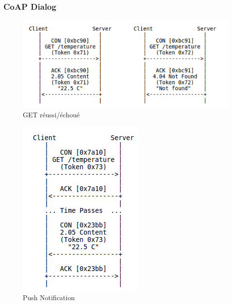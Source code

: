 \documentclass[compress]{beamer}
\begin{document}
\begin{frame}
	\frametitle{CoAP Dialog}
		\center
	\begin{minipage}[b]{.6\textwidth}
	\begin{figure}[h]
	\includegraphics[width=\textwidth]{coap_normal.png}
	\caption{GET réussi/échoué \cite{rfc7252}}
	\end{figure}
	\end{minipage}
	\begin{minipage}[b]{.3\textwidth}
	\begin{figure}[h]
	\includegraphics[width=\textwidth]{coap_push.png}
	\caption{Push Notification \cite{rfc7252}}
	\end{figure}
	\end{minipage}
\end{frame}
\end{document}
